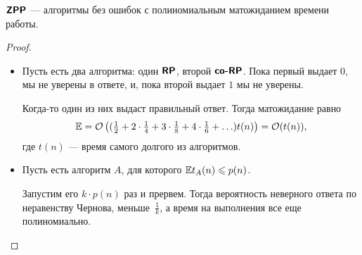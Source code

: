 \begin{defn}\index{\ZPP}
	$ \textmd{\textbf{\textsf{ZPP}}}$ --- алгоритмы без ошибок с полиномиальным матожиданием времени работы.
\end{defn}
\begin{proof}
	\begin{itemize}
		\item
			Пусть есть два алгоритма: один $ \textmd{\textbf{\textsf{RP}}}$, второй $ \textmd{\textbf{\textsf{co-RP}}}$. Пока первый выдает  $ 0$, мы не уверены в ответе, и, пока второй выдает $ 1$ мы не уверены.

			Когда-то один из них выдаст правильный ответ.
			Тогда матожидание равно
			\[
				\mathbb{E} = \mathcal{O}\left( (\tfrac{1}{2} + 2\cdot \tfrac{1}{4}+ 3\cdot \tfrac{1}{8} + 4\cdot \tfrac{1}{6} + \ldots ) t(n)\right)  = \mathcal{O}(t(n))
			,\]
			где $ t(n)$ --- время самого долгого из алгоритмов.
		\item Пусть есть алгоритм $A $, для которого $ \mathbb{E} t_{A}(n) \leqslant p(n)$.

			Запустим его  $ k \cdot  p(n)$ раз и прервем.
			Тогда вероятность неверного ответа по неравенству Чернова, меньше~$ \frac{1}{k}$, а время на выполнения все еще полиномиально.
	\end{itemize}
\end{proof}

